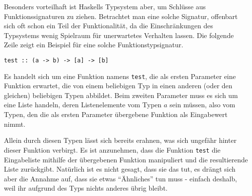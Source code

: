 Besonders vorteilhaft ist Haskells Typsystem aber, um Schlüsse aus Funk\-tions\-sig\-na\-tu\-ren zu ziehen. Betrachtet man eine solche Signatur, offenbart sich oft schon ein Teil der Funktionalität, da die
Einschränkungen des Typsystems wenig Spielraum für unerwartetes Verhalten lassen. Die folgende Zeile zeigt ein Beispiel
für eine solche Funktionstypsignatur.
%

\begin{verbatim}
test :: (a -> b) -> [a] -> [b]
\end{verbatim}

Es handelt sich um eine Funktion namens \texttt{test}, die als ersten Parameter eine Funktion erwartet, die von einem beliebigen
Typ in einen anderen (oder den gleichen) beliebigen Typen abbildet. Beim zweiten Parameter muss es sich um eine Liste handeln,
deren Listenelemente vom Typen $a$ sein müssen, also vom Typen, den die als ersten Parameter übergebene Funktion als
Eingabewert nimmt.

Allein durch diesen Typen lässt sich bereits erahnen, was sich ungefähr hinter dieser Funktion verbirgt.
Es ist anzunehmen, dass die  Funktion \texttt{test} die Eingabeliste mithilfe der übergebenen Funktion manipuliert und die
resultierende Liste zurückgibt. Natürlich ist es nicht gesagt, dass sie das tut, es drängt sich aber die Annahme auf, dass sie
etwas ``Ähnliches'' tun muss - einfach deshalb, weil ihr aufgrund des Typs nichts anderes übrig bleibt.

